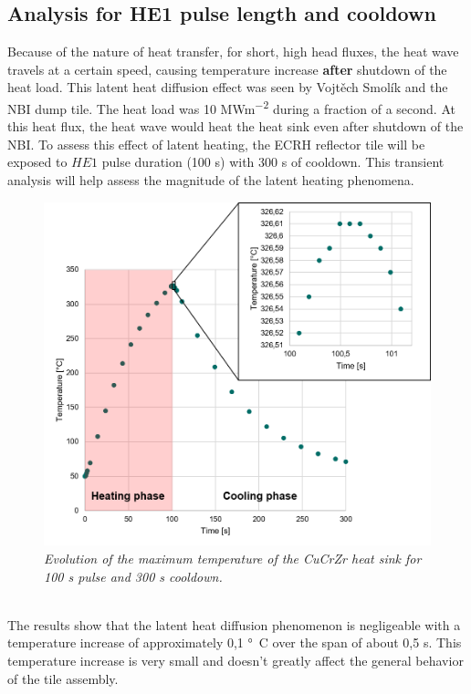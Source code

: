 \subsection{Analysis for HE1 pulse length and cooldown}
\normalsize{Because of the nature of heat transfer, for short, high head fluxes, the heat wave travels at a certain speed, causing temperature increase {\bfseries after} shutdown of the heat load. This latent heat diffusion effect was seen by Vojtěch Smolík and the \acrshort{NBI} dump tile. The heat load was 10 \unit{MWm^{-2}} during a fraction of a second. At this heat flux, the heat wave would heat the heat sink even after shutdown of the \acrshort{NBI}. To assess this effect of latent heating, the \acrshort{ECRH} reflector tile will be exposed to $HE1$ pulse duration (100 \unit{s}) with 300 \unit{s} of cooldown. This transient analysis will help assess the magnitude of the latent heating phenomena.}
\begin{figure}[!ht]
    \label{fig_5_13} 
    \centering
    \includegraphics[width=.9\textwidth]{figures/HEATSINKLatentHeatingII.png}
    \caption{\it Evolution of the maximum temperature of the \acrshort{CuCrZr} heat sink for 100 \unit{s} pulse and 300 \unit{s} cooldown.}
\end{figure}
\\
\normalsize{\indent The results show that the latent heat diffusion phenomenon is negligeable with a temperature increase of approximately 0,1 \unit{\si{\degree}C} over the span of about 0,5 \unit{s}. This temperature increase is very small and doesn't greatly affect the general behavior of the tile assembly.}